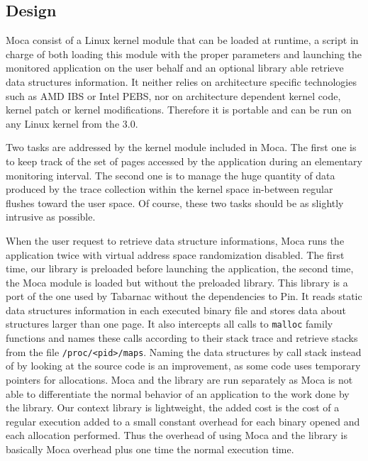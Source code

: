 \subsection{Design}
\label{sec:moca-design}

\gls{Moca} consist of a Linux kernel module that can be loaded at runtime,  a script in charge of both loading this module with the proper parameters and launching the monitored application on the user behalf and an optional library able retrieve data structures information.
It neither relies on architecture specific technologies such as \gls{AMD} \gls{IBS} or \gls{Intel} \gls{PEBS}, nor on architecture dependent kernel code, kernel patch or kernel modifications.
Therefore it is portable and can be run on any Linux kernel from the $3.0$.

Two tasks are addressed by the kernel module included in \gls{Moca}.
The first one is to keep track of the set of pages accessed by the application during an elementary monitoring interval.
The second one is to manage the huge quantity of data produced by the trace collection within the kernel space in-between regular flushes toward the user space.
Of course, these two tasks should be as slightly intrusive as possible.

When the user request to retrieve data structure informations, \gls{Moca} runs the application twice with virtual address space randomization disabled.
The first time, our library is preloaded before launching the application, the second time, the \gls{Moca} module is loaded but without the preloaded library.
This library is a port of the one used by \gls{Tabarnac} without the dependencies to \gls{Pin}.
It reads static data structures information in each executed binary file and stores data about structures larger than one page.
It also intercepts all calls to \texttt{malloc} family functions and names these calls according to their stack trace and retrieve stacks from the file \texttt{/proc/<pid>/maps}.
Naming the data structures by call stack instead of by looking at the source code is an improvement, as some code uses temporary pointers for allocations.
\gls{Moca} and the library are run separately as \gls{Moca} is not able to differentiate the normal behavior of an application to the work done by the library.
Our context library is lightweight, the added cost is the cost of a regular execution added to a small constant overhead for each binary opened and each allocation performed.
Thus the overhead of using \gls{Moca} and the library is basically \gls{Moca} overhead plus one time the normal execution time.

